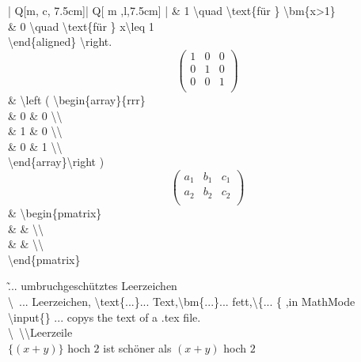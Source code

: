 \begin{center}
\begin{tblr}{| Q[m, c, 7.5cm]| Q[ m ,l,7.5cm] | }
{            \qquad \& 1 \textbackslash quad \textbackslash text\{für \} \textbackslash bm\{x>1\}\\
            \qquad \& 0 \textbackslash quad \textbackslash text\{für \} x\textbackslash leq 1\\
        \textbackslash end\{aligned\} \textbackslash right.}\\ \hline
        \[\left( \begin{array}{rrr}
            1 & 0 & 0 \\ 
            0 & 1 & 0 \\
            0 & 0 & 1 \\ 
        \end{array}\right)\]
        & {
        \textbackslash left ( \textbackslash begin\{array\}\{rrr\}\\
             \& 0 \& 0 \textbackslash\textbackslash\\ 
             \& 1 \& 0 \textbackslash\textbackslash\\
             \& 0 \& 1 \textbackslash\textbackslash\\ 
        \textbackslash end\{array\}\textbackslash right )}\\ \hline
        \[\begin{pmatrix}
            a_1 & b_1 & c_1 \\
            a_2 & b_2 & c_2 \\
        \end{pmatrix}\]
        & {\textbackslash begin\{pmatrix\}\\
            \qquad  \&  \&  \textbackslash\textbackslash \\
            \qquad  \&  \&  \textbackslash\textbackslash \\
        \textbackslash end\{pmatrix\}}\\ \hline
    \end{tblr}
    \label{table:commands}
\end{center}


\~ ... umbruchgeschütztes Leerzeichen\\
\textbackslash\ ... Leerzeichen, \textbackslash text\{...\}... Text,\textbackslash bm\{...\}... fett,\textbackslash \{... \{ ,in MathMode\\
\textbackslash input\{\} ... copys the text of a .tex file.\\
\textbackslash \ \textbackslash\textbackslash Leerzeile\\
$\{(x+y)\}$ hoch $2$ ist schöner als $(x+y)$ hoch $2$


